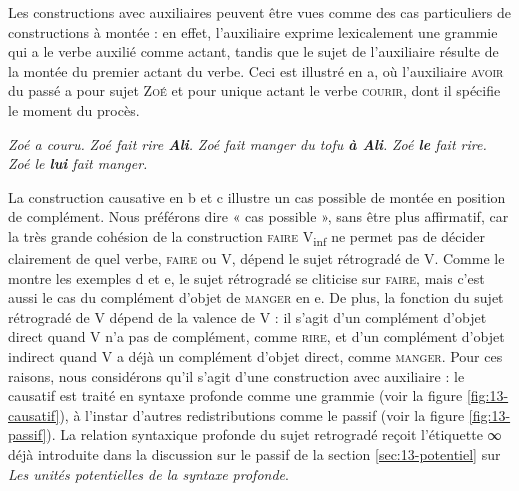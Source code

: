Les constructions avec auxiliaires peuvent être vues comme des cas particuliers de constructions à montée : en effet, l’auxiliaire exprime lexicalement une grammie qui a le verbe auxilié comme actant, tandis que le sujet de l’auxiliaire résulte de la montée du premier actant du verbe. Ceci est illustré en a, où l’auxiliaire \textsc{avoir} du passé a pour sujet \textsc{Zoé} et pour unique actant le verbe \textsc{courir}, dont il spécifie le moment du procès.

\ea\label{ex:13-aux}
\ea \textit{Zoé a couru.}
\ex \textit{Zoé fait rire \textbf{Ali}.}
\ex \textit{Zoé fait manger du tofu \textbf{à Ali}.}
\ex \textit{Zoé \textbf{le} fait rire.}
\ex \textit{Zoé le \textbf{lui} fait manger.}\z\z

La construction causative en b et c illustre un cas possible de montée en position de complément. Nous préférons dire « cas possible », sans être plus affirmatif, car la très grande cohésion de la construction \textsc{faire} V\textsubscript{inf} ne permet pas de décider clairement de quel verbe, \textsc{faire} ou V, dépend le sujet rétrogradé de V. Comme le montre les exemples d et e, le sujet rétrogradé se cliticise sur \textsc{faire}, mais c’est aussi le cas du complément d’objet de \textsc{manger} en e. De plus, la fonction du sujet rétrogradé de V dépend de la valence de V : il s’agit d’un complément d’objet direct quand V n’a pas de complément, comme \textsc{rire}, et d’un complément d’objet indirect quand V a déjà un complément d’objet direct, comme \textsc{manger}. Pour ces raisons, nous considérons qu’il s’agit d’une construction avec auxiliaire : le causatif est traité en syntaxe profonde comme une grammie (voir la figure \ref{fig:13-causatif}), à l’instar d’autres redistributions comme le passif (voir la figure \ref{fig:13-passif}). La relation syntaxique profonde du sujet retrogradé reçoit l’étiquette ∞ déjà introduite dans la discussion sur le passif de la section \ref{sec:13-potentiel} sur \textit{Les unités potentielles de la syntaxe profonde}.

